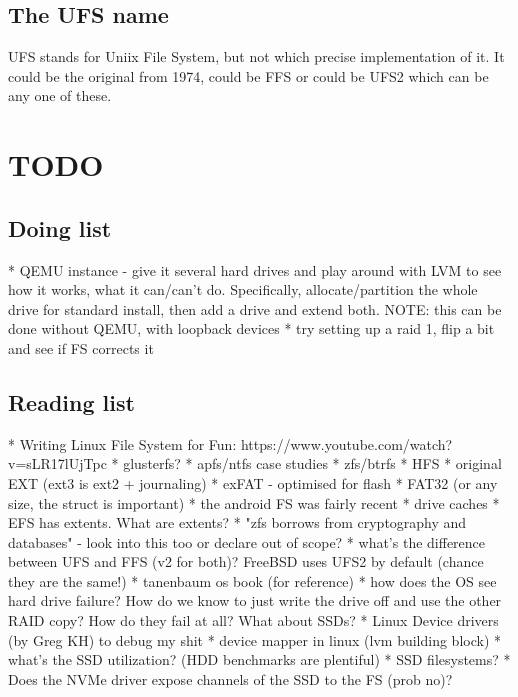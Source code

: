 \documentclass[a4paper]{report}
\begin{document}
    \subsection{The UFS name}

        UFS stands for Uniix File System, but not which precise implementation
        of it. It could be the original from 1974, could be FFS or could be
        UFS2 which can be any one of these.


\section{TODO}

    \subsection{Doing list}
        * QEMU instance
            - give it several hard drives and play around with LVM to see how
            it works, what it can/can't do. Specifically, allocate/partition
            the whole drive for standard install, then add a drive and extend
            both. NOTE: this can be done without QEMU, with loopback devices
        * try setting up a raid 1, flip a bit and see if FS corrects it

    \subsection{Reading list}
        * Writing Linux File System for Fun: https://www.youtube.com/watch?v=sLR17lUjTpc
        * glusterfs?
        * apfs/ntfs case studies
        * zfs/btrfs
        * HFS
        * original EXT (ext3 is ext2 + journaling)
        * exFAT - optimised for flash
        * FAT32 (or any size, the struct is important)
        * the android FS was fairly recent
        * drive caches
        * EFS has extents. What are extents?
        * "zfs borrows from cryptography and databases" - look into this too or declare out of scope?
        * what's the difference between UFS and FFS (v2 for both)? FreeBSD uses UFS2 by default (chance they are the same!)
        * tanenbaum os book (for reference)
        * how does the OS see hard drive failure? How do we know to just write the drive off and use the other RAID copy?
          How do they fail at all? What about SSDs?
        * Linux Device drivers (by Greg KH) to debug my shit
        * device mapper in linux (lvm building block)
        * what's the SSD utilization? (HDD benchmarks are plentiful)
        * SSD filesystems?
        * Does the NVMe driver expose channels of the SSD to the FS (prob no)?
\end{document}
